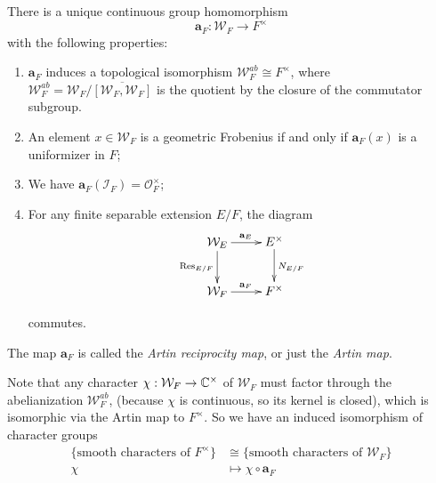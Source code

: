 \begin{thm}
	There is a unique continuous group homomorphism
	\[\mathbf{a}_F: \mathcal{W}_F\to F^\times\]
	with the following properties:
	\begin{enumerate}
		\item $\mathbf{a}_F$ induces a topological isomorphism $\mathcal{W}_F^{ab}\cong F^\times$, where $\mathcal{W}_F^{ab} = \mathcal{W}_F/\overline{[\mathcal{W}_F, \mathcal{W}_F]}$ is the quotient by the closure of the commutator subgroup.
		\item An element $x\in \mathcal{W}_F$ is a geometric Frobenius if and only if $\mathbf{a}_F(x)$ is a uniformizer in $F$;
		\item We have $\mathbf{a}_F(\mathcal{I}_F) = \mathcal{O}_F^\times$;
		\item For any finite separable extension $E/F$, the diagram 
		$$\xymatrix{
			\mathcal W_E \ar[r]^{\mathbf a_E} \ar[d]_{\Res_{E/F}} & E^\times \ar[d]^{N_{E/F}} \\
			\mathcal W_F \ar[r]^{\mathbf a_F} & F^\times
		}$$
		
		commutes.
	\end{enumerate}
	The map $\mathbf{a}_F$ is called the \emph{Artin reciprocity map}, or just the \emph{Artin map}.
\end{thm}
Note that any character $\chi: \mathcal{W}_F\to \mathbb{C}^\times$ of $\mathcal{W}_F$ must factor through the abelianization $\mathcal{W}_F^{ab}$, (because $\chi$ is continuous, so its kernel is closed), which is isomorphic via the Artin map to $F^\times$. So we have an induced isomorphism of character groups
\begin{align*}
	\{\text{smooth characters of }F^\times\} &\cong \{\text{smooth characters of }\mathcal{W}_F\}\\
	\chi &\mapsto \chi\circ\mathbf{a}_F
\end{align*}
